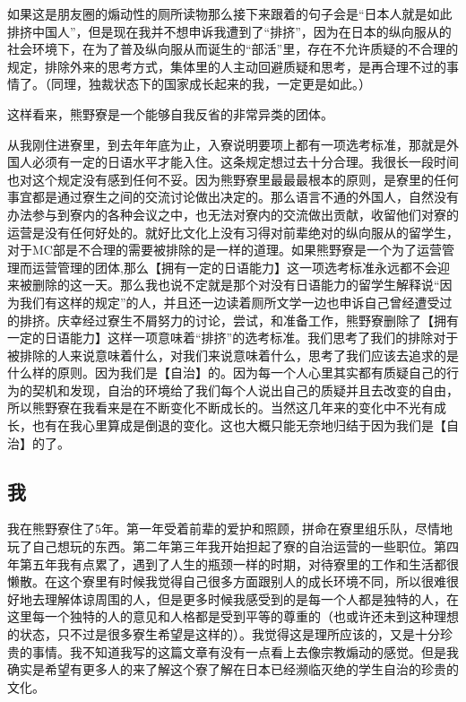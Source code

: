 \documentclass[10pt,b5jsbook,dvips,dvipdfmx,openany]{jsbook}
\theoremstyle{definition}
\begin{document}
如果这是朋友圈的煽动性的厕所读物那么接下来跟着的句子会是“日本人就是如此排挤中国人”，但是现在我并不想申诉我遭到了“排挤”，因为在日本的纵向服从的社会环境下，在为了普及纵向服从而诞生的“部活”里，存在不允许质疑的不合理的规定，排除外来的思考方式，集体里的人主动回避质疑和思考，是再合理不过的事情了。（同理，独裁状态下的国家成长起来的我，一定更是如此。）

这样看来，熊野寮是一个能够自我反省的非常异类的团体。

从我刚住进寮里，到去年年底为止，入寮说明要项上都有一项选考标准，那就是外国人必须有一定的日语水平才能入住。这条规定想过去十分合理。我很长一段时间也对这个规定没有感到任何不妥。因为熊野寮里最最最根本的原则，是寮里的任何事宜都是通过寮生之间的交流讨论做出决定的。那么语言不通的外国人，自然没有办法参与到寮内的各种会议之中，也无法对寮内的交流做出贡献，收留他们对寮的运营是没有任何好处的。就好比文化上没有习得对前辈绝对的纵向服从的留学生，对于MC部是不合理的需要被排除的是一样的道理。如果熊野寮是一个为了运营管理而运营管理的团体,那么【拥有一定的日语能力】这一项选考标准永远都不会迎来被删除的这一天。那么我也说不定就是那个对没有日语能力的留学生解释说“因为我们有这样的规定”的人，并且还一边读着厕所文学一边也申诉自己曾经遭受过的排挤。庆幸经过寮生不屑努力的讨论，尝试，和准备工作，熊野寮删除了【拥有一定的日语能力】这样一项意味着“排挤”的选考标准。我们思考了我们的排除对于被排除的人来说意味着什么，对我们来说意味着什么，思考了我们应该去追求的是什么样的原则。因为我们是【自治】的。因为每一个人心里其实都有质疑自己的行为的契机和发现，自治的环境给了我们每个人说出自己的质疑并且去改变的自由，所以熊野寮在我看来是在不断变化不断成长的。当然这几年来的变化中不光有成长，也有在我心里算成是倒退的变化。这也大概只能无奈地归结于因为我们是【自治】的了。

\subsection{我}
我在熊野寮住了5年。第一年受着前辈的爱护和照顾，拼命在寮里组乐队，尽情地玩了自己想玩的东西。第二年第三年我开始担起了寮的自治运营的一些职位。第四年第五年我有点累了，遇到了人生的瓶颈一样的时期，对待寮里的工作和生活都很懒散。在这个寮里有时候我觉得自己很多方面跟别人的成长环境不同，所以很难很好地去理解体谅周围的人，但是更多时候我感受到的是每一个人都是独特的人，在这里每一个独特的人的意见和人格都是受到平等的尊重的（也或许还未到这种理想的状态，只不过是很多寮生希望是这样的）。我觉得这是理所应该的，又是十分珍贵的事情。我不知道我写的这篇文章有没有一点看上去像宗教煽动的感觉。但是我确实是希望有更多人的来了解这个寮了解在日本已经濒临灭绝的学生自治的珍贵的文化。
\end{document}

